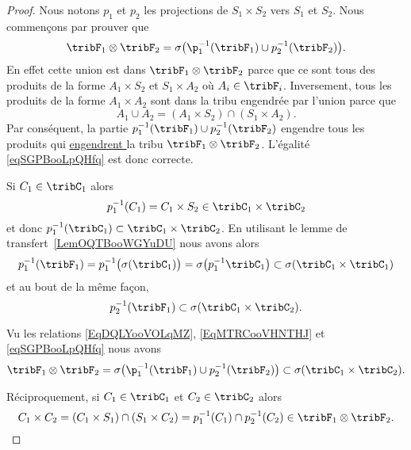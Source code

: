 \begin{proof}
    Nous notons \( p_1\) et \( p_2\) les projections de \( S_1\times S_2\) vers \( S_1\) et \( S_2\). Nous commençons par prouver que
    \begin{equation}    \label{eqSGPBooLpQHfq}
        \tribF_1\otimes \tribF_2=\sigma\big( \p_1^{-1}(\tribF_1)\cup p_2^{-1}(\tribF_2) \big).
    \end{equation}
    En effet cette union est dans \( \tribF_1\otimes \tribF_2\) parce que ce sont tous des produits de la forme \( A_1\times S_2\) et \( S_1\times A_2\) où \( A_i\in \tribF_i\). Inversement, tous les produits de la forme \( A_1\times A_2\) sont dans la tribu engendrée par l'union parce que
    \begin{equation}
        A_1\cup A_2=(A_1\times S_2)\cap(S_1\times A_2).
    \end{equation}
    Par conséquent, la partie \( p_1^{-1}(\tribF_1)\cup p_2^{-1}(\tribF_2)\) engendre tous les produits qui \href{https://fr.wikisource.org/wiki/Bible_Crampon_1923/Matthieu}{ engendrent } la tribu \( \tribF_1\otimes\tribF_2\). L'égalité \eqref{eqSGPBooLpQHfq} est donc correcte.

    Si \( C_1\in\tribC_1\) alors
    \begin{equation}
        p_1^{-1}(C_1)=C_1\times S_2\in\tribC_1\times \tribC_2
    \end{equation}
    et donc \( p_1^{-1}(\tribC_1)\subset \tribC_1\times \tribC_2\). En utilisant le lemme de transfert~\ref{LemOQTBooWGYuDU} nous avons alors
    \begin{equation}        \label{EqDQLYooVOLqMZ}
        p_1^{-1}(\tribF_1)=p_1^{-1}\big( \sigma(\tribC_1) \big)=\sigma\big( p_1^{-1}\tribC_1 \big)\subset\sigma(\tribC_1\times \tribC_1)
    \end{equation}
    et au bout de la même façon,
    \begin{equation}        \label{EqMTRCooVHNTHJ}
        p_2^{-1}(\tribF_1)\subset\sigma(\tribC_1\times \tribC_2).
    \end{equation}

    Vu les relations \eqref{EqDQLYooVOLqMZ}, \eqref{EqMTRCooVHNTHJ} et \eqref{eqSGPBooLpQHfq} nous avons
    \begin{equation}
        \tribF_1\otimes\tribF_2=\sigma\big( \p_1^{-1}(\tribF_1)\cup p_2^{-1}(\tribF_2) \big)\subset\sigma(\tribC_1\times \tribC_2).
    \end{equation}

    Réciproquement, si \( C_1\in \tribC_1\) et \( C_2\in \tribC_2\) alors
    \begin{equation}
        C_1\times C_2=(C_1\times S_1)\cap(S_1\times C_2)=p_1^{-1}(C_1)\cap p_2^{-1}(C_2)\in\tribF_1\otimes\tribF_2.
    \end{equation}
\end{proof}

